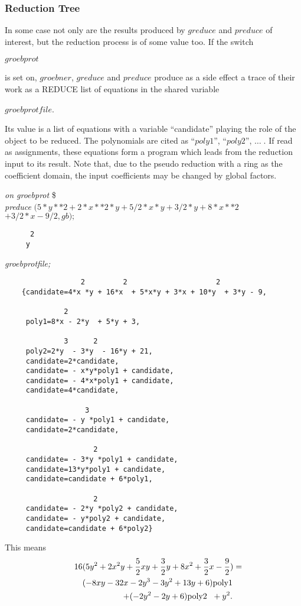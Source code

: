 \subsubsection{Reduction Tree}
In some case not only are the results produced by $greduce$ and
$preduce$ of interest, but the reduction process is of some value
too. If the switch
\begin{center}
$groebprot$
\end{center}
is set on, $groebner$, $greduce$ and $preduce$ produce as a side effect
a trace of their work as a REDUCE list of equations in the shared variable
\begin{center}
$groebprotfile$.
\end{center}
Its value is a list of equations with a variable ``candidate'' playing
the role of the object to be reduced. The polynomials are cited as
``$poly1$'', ``$poly2$'', $\ldots\;$. If read as assignments, these equations
form a program which leads from the reduction input to its result.
Note that, due to the pseudo reduction with a ring as the coefficient
domain, the input coefficients may be changed by global factors.

\example {}

{\it on groebprot} \$ \\
{\it preduce} $ (5*y**2 + 2*x**2*y + 5/2*x*y + 3/2*y + 8*x**2 $ \\
\hspace*{+1cm} $+ 3/2*x - 9/2, gb);$
\begin{verbatim}
      2
     y
\end{verbatim}
{\it groebprotfile;}
\begin{verbatim}
                  2         2                     2
    {candidate=4*x *y + 16*x  + 5*x*y + 3*x + 10*y  + 3*y - 9,

              2
     poly1=8*x - 2*y  + 5*y + 3,

              3      2
     poly2=2*y  - 3*y  - 16*y + 21,
     candidate=2*candidate,
     candidate= - x*y*poly1 + candidate,
     candidate= - 4*x*poly1 + candidate,
     candidate=4*candidate,

                   3
     candidate= - y *poly1 + candidate,
     candidate=2*candidate,

                     2
     candidate= - 3*y *poly1 + candidate,
     candidate=13*y*poly1 + candidate,
     candidate=candidate + 6*poly1,

                     2
     candidate= - 2*y *poly2 + candidate,
     candidate= - y*poly2 + candidate,
     candidate=candidate + 6*poly2}

 \end{verbatim}
This means
\begin{eqnarray*}
\lefteqn{
16 (5 y^2 + 2 x^2 y + \frac{5}{2} x y + \frac{3}{2} y
+ 8 x^2+ \frac{3}{2} x - \frac{9}{2})=} \\ & &
(-8 x y -32 x -2 y^3 -3 y^2 + 13 y + 6) \mbox{poly1} \\
& & \; + (-2 y^2 -2 y + 6) \mbox{poly2  } \; + y^2.
\end{eqnarray*}

